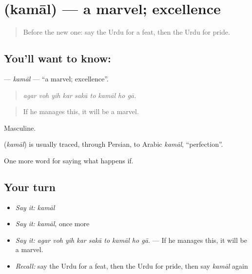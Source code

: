 \section[\texorpdfstring{\ur{کمال} (kamāl)}{کمال (kamāl)}]{ (kamāl) — a marvel; excellence}

\label{lesson:UR-C381-kamal}



\begin{quote}
Before the new one: say the Urdu for a feat, then the Urdu for pride.
\end{quote}

\subsection*{You'll want to know: }
\textbf{} — \emph{kamāl} — \textquotedblleft{}a marvel; excellence\textquotedblright{}.

\begin{quote}
        
\end{quote}

\begin{quote}
\emph{agar voh yih kar sakā to kamāl ho gā.}
\end{quote}

\begin{quote}
If he manages this, it will be a marvel.
\end{quote}

Masculine.

\begin{cousinweb}
\textbf{} (\emph{kamāl}) is usually traced, through Persian, to Arabic \emph{kamāl}, \textquotedblleft{}perfection\textquotedblright{}.
\end{cousinweb}

\begin{grammarlens}[title={What you've built}]
One more word for saying what happens if.
\end{grammarlens}

\subsection*{Your turn}
\begin{itemize}
\raggedright
  \item \emph{Say it:} \emph{kamāl}
  \item \emph{Say it:} \emph{kamāl}, once more
  \item \emph{Say it:} \emph{agar voh yih kar sakā to kamāl ho gā.} — If he manages this, it will be a marvel.
  \item \emph{Recall:} say the Urdu for a feat, then the Urdu for pride, then say \emph{kamāl} again
\end{itemize}

